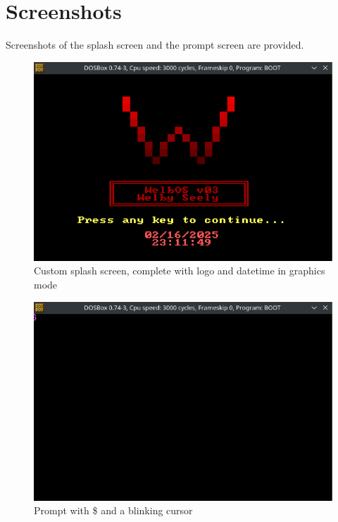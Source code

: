 \documentclass{article}
\begin{document}
    \section{Screenshots}\label{sec:screenshots}
    Screenshots of the splash screen and the prompt screen are provided.

    \begin{figure}[H]  %
        \centering
        \includegraphics[width=\textwidth]{splash-screen} %
        \caption{Custom splash screen, complete with logo and datetime in graphics mode}
        \label{fig:1}
    \end{figure}

    \begin{figure}[H]  %
        \centering
        \includegraphics[width=\textwidth]{prompt} %
        \caption{Prompt with \$ and a blinking cursor}
        \label{fig:2}
    \end{figure}
\end{document}
